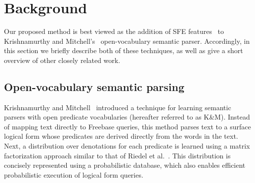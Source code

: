 \documentclass[11pt]{article}
\newcommand{\secref}[1]{Section~\ref{sec:#1}}
\begin{document}
% 

\section{Background}
\label{sec:background}

Our proposed method is best viewed as the addition of SFE
features~\cite{gardner-2015-sfe} to Krishnamurthy and
Mitchell's~
open-vocabulary semantic parser.  Accordingly, in this section we briefly
describe both of these techniques, as well as give a short overview of other
closely related work.

\subsection{Open-vocabulary semantic parsing}
\label{sec:jayant-semparse}

Krishnamurthy and
Mitchell~
introduced a technique for learning semantic parsers with open
predicate vocabularies (hereafter referred to as K\&M). Instead of
mapping text directly to Freebase queries, this method parses text to
a surface logical form whose predicates are derived directly from the
words in the text. Next, a distribution over denotations for each
predicate is learned using a matrix factorization approach similar to
that of Riedel et
al.~. This distribution is
concisely represented using a probabilistic database, which also
enables efficient probabilistic execution of logical form queries.
\end{document}
